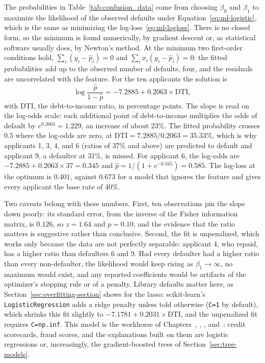\documentclass[../ai_in_finance]{subfiles}
\begin{document}
The probabilities in Table~\ref{tab:confusion_data} come from choosing $\beta_0$ and $\beta_1$ to maximize the likelihood of the observed defaults under Equation~\eqref{eq:ml-logistic}, which is the same as minimizing the log-loss~\eqref{eq:ml-logloss}. There is no closed form, so the minimum is found numerically, by gradient descent or, as statistical software usually does, by Newton's method. At the minimum two first-order conditions hold, $\sum_i (y_i - \hat p_i) = 0$ and $\sum_i x_i (y_i - \hat p_i) = 0$: the fitted probabilities add up to the observed number of defaults, four, and the residuals are uncorrelated with the feature. For the ten applicants the solution is
\begin{equation*}
\log\frac{\hat p}{1-\hat p} = -7.2885 + 0.2063 \times \text{DTI},
\end{equation*}
with DTI, the debt-to-income ratio, in percentage points. The slope is read on the log-odds scale: each additional point of debt-to-income multiplies the odds of default by $e^{0.2063} = 1.229$, an increase of about 23\%. The fitted probability crosses $0.5$ where the log-odds are zero, at $\text{DTI} = 7.2885/0.2063 = 35.33\%$, which is why applicants 1, 3, 4, and 6 (ratios of 37\% and above) are predicted to default and applicant 9, a defaulter at 31\%, is missed. For applicant 6, the log-odds are $-7.2885 + 0.2063 \times 37 = 0.345$ and $\hat p = 1/(1+e^{-0.345}) = 0.585$. The log-loss at the optimum is $0.401$, against $0.673$ for a model that ignores the feature and gives every applicant the base rate of 40\%.

Two caveats belong with these numbers. First, ten observations pin the slope down poorly: its standard error, from the inverse of the Fisher information matrix, is $0.126$, so $z = 1.64$ and $p = 0.10$, and the evidence that the ratio matters is suggestive rather than conclusive. Second, the fit is unpenalized, which works only because the data are not perfectly separable: applicant 4, who repaid, has a higher ratio than defaulters 6 and 9. Had every defaulter had a higher ratio than every non-defaulter, the likelihood would keep rising as $\beta_1 \to \infty$, no maximum would exist, and any reported coefficients would be artifacts of the optimizer's stopping rule or of a penalty. Library defaults matter here, as Section~\ref{sec:overfitting-section} shows for the lasso: scikit-learn's \texttt{LogisticRegression} adds a ridge penalty unless told otherwise (\texttt{C=1} by default), which shrinks this fit slightly to $-7.1781 + 0.2031 \times \text{DTI}$, and the unpenalized fit requires \texttt{C=np.inf}. This model is the workhorse of Chapters~, , , and~: credit scorecards, fraud scores, and the explanations built on them are logistic regressions or, increasingly, the gradient-boosted trees of Section~\ref{sec:tree-models}.
\end{document}
